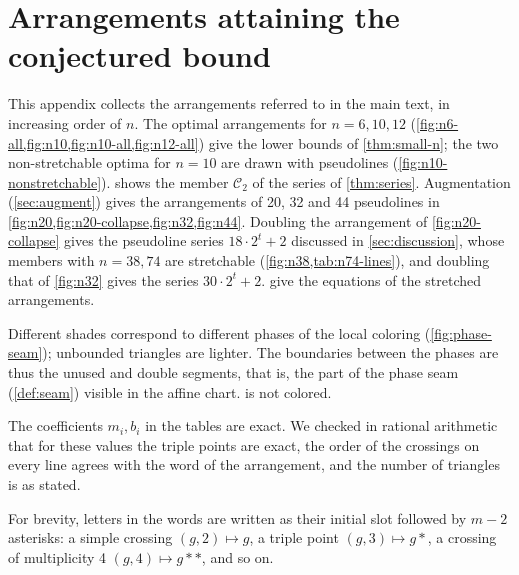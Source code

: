 \section{Arrangements attaining the conjectured bound}\label{app:figures}

This appendix collects the arrangements referred to in the main text, in increasing order of $n$.
The optimal arrangements for $n=6,10,12$ (\cref{fig:n6-all,fig:n10,fig:n10-all,fig:n12-all}) give the lower bounds of \cref{thm:small-n}; the two non-stretchable optima for $n=10$ are drawn with pseudolines (\cref{fig:n10-nonstretchable}).
 shows the member $\mathcal C_2$ of the series of \cref{thm:series}.
Augmentation (\cref{sec:augment}) gives the arrangements of 20, 32 and 44 pseudolines in \cref{fig:n20,fig:n20-collapse,fig:n32,fig:n44}.
Doubling the arrangement of \cref{fig:n20-collapse} gives the pseudoline series $18\cdot2^t+2$ discussed in \cref{sec:discussion}, whose members with $n=38,74$ are stretchable (\cref{fig:n38,tab:n74-lines}), and doubling that of \cref{fig:n32} gives the series $30\cdot2^t+2$.
 give the equations of the stretched arrangements.

Different shades correspond to different phases of the local coloring (\cref{fig:phase-seam}); unbounded triangles are lighter.
The boundaries between the phases are thus the unused and double segments, that is, the part of the phase seam (\cref{def:seam}) visible in the affine chart.
 is not colored.

The coefficients $m_i,b_i$ in the tables are exact.
We checked in rational arithmetic that for these values the triple points are exact, the order of the crossings on every line agrees with the word of the arrangement, and the number of triangles is as stated.

For brevity, letters in the words are written as their initial slot followed by $m-2$ asterisks: a simple crossing $(g,2)\mapsto g$, a triple point $(g,3)\mapsto g*$, a crossing of multiplicity 4 $(g,4)\mapsto g**$, and so on.


\newcommand\ngap{\hspace{0.01\linewidth}}
\newcommand\nsix[1]{\begin{minipage}{0.326\linewidth}\end{minipage}}


